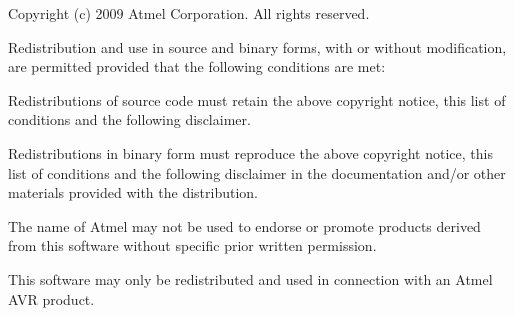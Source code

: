 Copyright (c) 2009 Atmel Corporation. All rights reserved.

Redistribution and use in source and binary forms, with or without modification, are permitted provided that the following conditions are met\-:


\begin{DoxyEnumerate}
\item Redistributions of source code must retain the above copyright notice, this list of conditions and the following disclaimer.
\end{DoxyEnumerate}


\begin{DoxyEnumerate}
\item Redistributions in binary form must reproduce the above copyright notice, this list of conditions and the following disclaimer in the documentation and/or other materials provided with the distribution.
\end{DoxyEnumerate}


\begin{DoxyEnumerate}
\item The name of Atmel may not be used to endorse or promote products derived from this software without specific prior written permission.
\end{DoxyEnumerate}


\begin{DoxyEnumerate}
\item This software may only be redistributed and used in connection with an Atmel A\-V\-R product.
\end{DoxyEnumerate}

